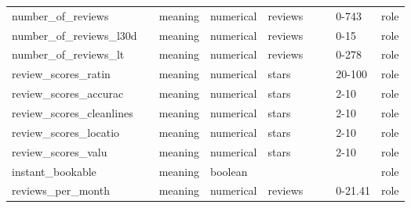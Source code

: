 \begin{center}
\begin{longtable}{@{}lllllllll@{}}
number\_of\_reviews         &                             & meaning                           & numerical   & reviews        &                             &                     & 0-743   & role \\
number\_of\_reviews\_l30d   &                             & meaning                           & numerical   & reviews        &                             &                     & 0-15    & role \\
number\_of\_reviews\_lt     &                             & meaning                           & numerical   & reviews        &                             &                     & 0-278   & role \\
review\_scores\_ratin       &                             & meaning                           & numerical   & stars          &                             &                     & 20-100  & role \\
review\_scores\_accurac     &                             & meaning                           & numerical   & stars          &                             &                     & 2-10    & role \\
review\_scores\_cleanlines  &                             & meaning                           & numerical   & stars          &                             &                     & 2-10    & role \\
review\_scores\_locatio     &                             & meaning                           & numerical   & stars          &                             &                     & 2-10    & role \\
review\_scores\_valu        &                             & meaning                           & numerical   & stars          &                             &                     & 2-10    & role \\
instant\_bookable           &                             & meaning                           & boolean     &                &                             &                     &         & role \\
reviews\_per\_month         &                             & meaning                           & numerical   & reviews        &                             &                     & 0-21.41 & role \\ \bottomrule
\end{longtable}

\end{center}
